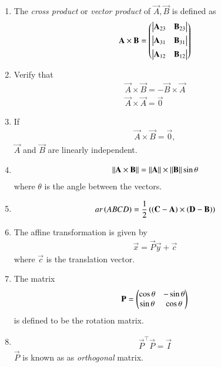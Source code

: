 \begin{enumerate}[label=\thesubsection.\arabic*.,ref=\thesubsection.\theenumi]
\item The {\em cross product} or {\em vector product} of $\vec{A}, \vec{B}$ is defined as
\begin{align}
  \label{eq:cross3d}
	\mathbf{A} \times \mathbf{B} 
	 = \begin{pmatrix} \begin{vmatrix}\mathbf{A}_{23} & \mathbf{B}_{23}\end{vmatrix} \\[1ex] \begin{vmatrix}\mathbf{A}_{31} & \mathbf{B}_{31}\end{vmatrix} \\[1ex] \begin{vmatrix}\mathbf{A}_{12}  & \mathbf{B}_{12}\end{vmatrix}\end{pmatrix}
\end{align}
\item Verify that
\begin{align}
  \label{eq:cross3d-commute}
  \vec{A} \times \vec{B} = -  \vec{B} \times \vec{A} 
  \\
  \label{eq:cross3d-same}
  \vec{A} \times \vec{A} = \vec{0}
\end{align}
\item If 
		\label{prop:lin-dep-cross}
\begin{align}
  \vec{A} \times \vec{B} = \vec{0},
\end{align}
  $\vec{A}$ and $ \vec{B} $ are linearly independent.
  \item 
\begin{align}
	\label{eq:cross-sin}
	\left\lVert \mathbf{A} \times \mathbf{B} \right\rVert
	=
	\left\lVert\mathbf{A}\right\rVert \times 	\left\lVert\mathbf{B}\right\rVert \sin \theta
\end{align}
where $\theta$ is the angle between the vectors.
\item 
\begin{align}
	ar\left(ABCD\right) = 
         \frac{1}{2}\left(\left(\mathbf{C}-\mathbf{A}\right)\times\left(\mathbf{D}-\mathbf{B}\right)\right) \\
        \label{eq:11/10/1/1area-diag} 
\end{align}
	\item 
The affine transformation is given by 
\begin{align}
	\label{eq:conic_affine}
	\vec{x} = \vec{P}\vec{y}+\vec{c}
\end{align}
where $\vec{c}$ is the translation vector.
\item The matrix
\begin{align}
\mathbf{P} =
\begin{pmatrix}
\cos\theta & -\sin\theta \\
\sin\theta & \cos\theta 
\end{pmatrix}
\end{align}
is defined to be the rotation matrix. 
\item 
\begin{align}
	\vec{P}^{\top} \vec{P} = \vec{I}
\end{align}
		$\vec{P}$ is known as as {\em orthogonal} matrix.

\end{enumerate}
